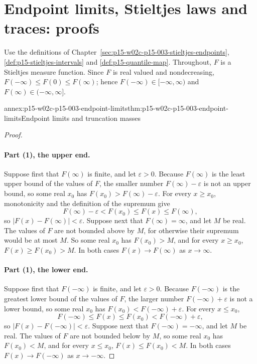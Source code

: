 \section{Endpoint limits, Stieltjes laws and traces: proofs}
\label{sec:annex-p15-w02c-p15-003-stieltjes-endpoints}

Use the definitions of
Chapter~\ref{sec:p15-w02c-p15-003-stieltjes-endpoints},
\cref{def:p15-stieltjes-intervals} and \cref{def:p15-quantile-map}.
Throughout, \(F\) is a Stieltjes measure function. Since \(F\) is real
valued and nondecreasing, \(F(-\infty)\leq F(0)\leq F(\infty)\); hence
\(F(-\infty)\in[-\infty,\infty)\) and \(F(\infty)\in(-\infty,\infty]\).

\begin{annexitem}{annex:p15-w02c-p15-003-endpoint-limits}{thm:p15-w02c-p15-003-endpoint-limits}{Endpoint limits and truncation masses}
\begin{proof}
\paragraph{Part (1), the upper end.}
Suppose first that \(F(\infty)\) is finite, and let
\(\varepsilon>0\). Because \(F(\infty)\) is the least upper bound of the
values of \(F\), the smaller number \(F(\infty)-\varepsilon\) is not an
upper bound, so some real \(x_0\) has
\(F(x_0)>F(\infty)-\varepsilon\). For every \(x\geq x_0\),
monotonicity and the definition of the supremum give
\[
 F(\infty)-\varepsilon<F(x_0)\leq F(x)\leq F(\infty),
\]
so \(|F(x)-F(\infty)|<\varepsilon\). Suppose next that
\(F(\infty)=\infty\), and let \(M\) be real. The values of \(F\) are
not bounded above by \(M\), for otherwise their supremum would be at most
\(M\). So some real \(x_0\) has \(F(x_0)>M\), and for every
\(x\geq x_0\), \(F(x)\geq F(x_0)>M\). In both cases
\(F(x)\to F(\infty)\) as \(x\to\infty\).

\paragraph{Part (1), the lower end.}
Suppose first that \(F(-\infty)\) is finite, and let
\(\varepsilon>0\). Because \(F(-\infty)\) is the greatest lower bound
of the values of \(F\), the larger number
\(F(-\infty)+\varepsilon\) is not a lower bound, so some real \(x_0\)
has \(F(x_0)<F(-\infty)+\varepsilon\). For every \(x\leq x_0\),
\[
 F(-\infty)\leq F(x)\leq F(x_0)<F(-\infty)+\varepsilon ,
\]
so \(|F(x)-F(-\infty)|<\varepsilon\). Suppose next that
\(F(-\infty)=-\infty\), and let \(M\) be real. The values of \(F\) are
not bounded below by \(M\), so some real \(x_0\) has \(F(x_0)<M\), and
for every \(x\leq x_0\), \(F(x)\leq F(x_0)<M\). In both cases
\(F(x)\to F(-\infty)\) as \(x\to-\infty\).


\end{proof}
\end{annexitem}
